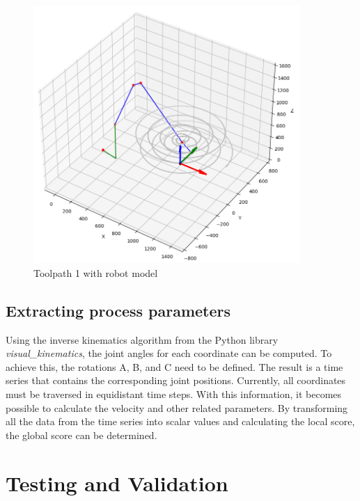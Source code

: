 \begin{figure}[H]
	\centerline{\includegraphics[width=0.9\textwidth]{figures/robotANDpath1.png}}
	\caption{Toolpath 1 with robot model}
	\label{TP1robot}
\end{figure}




\subsection{Extracting process parameters}
Using the inverse kinematics algorithm from the Python library \textit{visual\_kinematics}, the joint angles for each coordinate can be computed. To achieve this, the rotations A, B, and C need to be defined. The result is a time series that contains the corresponding joint positions. Currently, all coordinates must be traversed in equidistant time steps. With this information, it becomes possible to calculate the velocity and other related parameters. By transforming all the data from the time series into scalar values and calculating the local score, the global score can be determined.
\newpage
\section{Testing and Validation}%

